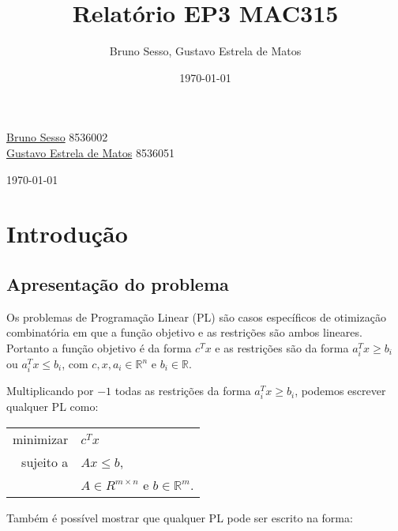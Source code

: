 \documentclass[12pt]{article}
\title{Relatório EP3 MAC315}
\author{Bruno Sesso, Gustavo Estrela de Matos}
\date{\today}
\begin{document}
\begin{titlepage}
	
    \bigskip
    \bigskip
    \bigskip
    \bigskip
    \bigskip
    \bigskip

\begin{center}
	\begin{flushleft}
    	\textcolor{title_color} {
        	\fontsize{1cm}{1em}\selectfont {Implementação do Método Simplex\\}
    	}
    \end{flushleft}
  
	\bigskip
    \begin{flushleft}{
    \textcolor{text_color} {
    	\href{mailto:bsesso@gmail.com}{Bruno Sesso} 8536002\\    					      		           \href{mailto:estrela.gustavo.matos@gmail.com}{Gustavo Estrela de Matos} 8536051\\}
    }
    \end{flushleft}
    
	\bigskip
    \bigskip
    \bigskip
    \bigskip
    \bigskip
    \bigskip	\bigskip
    \bigskip
    \bigskip
    \bigskip
    \bigskip
    \bigskip	\bigskip
    \bigskip
    \bigskip
    \bigskip
    \bigskip
	\today
\end{center}
\end{titlepage}

\newpage
\section{Introdução}



\subsection{Apresentação do problema}
    Os problemas de Programação Linear (PL) são casos específicos de otimização combinatória em que a função objetivo e as restrições são ambos lineares. Portanto a função objetivo é da forma $c^{T}x$ e as restrições são da forma $a_{i}^{T}x \geq b_{i}$ ou $a_{i}^{T}x \leq b_{i}$, com $c, x, a_i \in \mathbb{R}^{n}$ e $b_{i} \in \mathbb{R}$.
    
    Multiplicando por $-1$ todas as restrições da forma $a_{i}^{T}x \geq b_i$, podemos escrever qualquer PL como:

    \begin{center}
    	\begin{tabular}{r l}
        	minimizar & $c^Tx$ \\
        
	        sujeito a & $Ax \leq b$, \\
        
        			  & $A \in R^{m \times n}$ e $b \in \mathbb{R}^m$.
		\end{tabular}
    \end{center}
	Também é possível mostrar que qualquer PL pode ser escrito na forma: 
\end{document}
